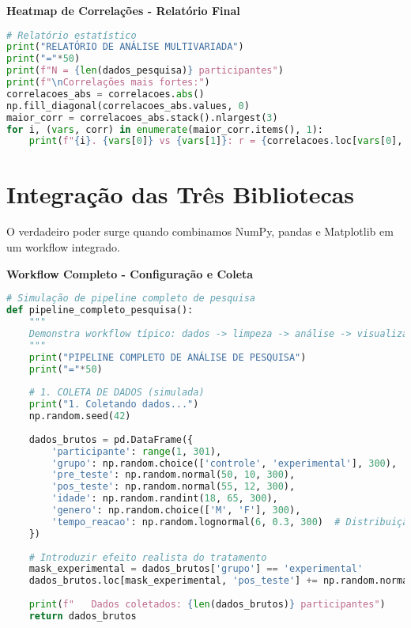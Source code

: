 \begin{researchbox}
\textbf{Heatmap de Correlações - Relatório Final}

\begin{lstlisting}[language=Python]
# Relatório estatístico
print("RELATÓRIO DE ANÁLISE MULTIVARIADA")
print("="*50)
print(f"N = {len(dados_pesquisa)} participantes")
print(f"\nCorrelações mais fortes:")
correlacoes_abs = correlacoes.abs()
np.fill_diagonal(correlacoes_abs.values, 0)
maior_corr = correlacoes_abs.stack().nlargest(3)
for i, (vars, corr) in enumerate(maior_corr.items(), 1):
    print(f"{i}. {vars[0]} vs {vars[1]}: r = {correlacoes.loc[vars[0], vars[1]]:.3f}")
\end{lstlisting}
\end{researchbox}

\section{Integração das Três Bibliotecas}

O verdadeiro poder surge quando combinamos NumPy, pandas e Matplotlib em um workflow integrado.

\begin{examplebox}
\textbf{Workflow Completo - Configuração e Coleta}

\begin{lstlisting}[language=Python]
# Simulação de pipeline completo de pesquisa
def pipeline_completo_pesquisa():
    """
    Demonstra workflow típico: dados -> limpeza -> análise -> visualização
    """
    print("PIPELINE COMPLETO DE ANÁLISE DE PESQUISA")
    print("="*50)
    
    # 1. COLETA DE DADOS (simulada)
    print("1. Coletando dados...")
    np.random.seed(42)
    
    dados_brutos = pd.DataFrame({
        'participante': range(1, 301),
        'grupo': np.random.choice(['controle', 'experimental'], 300),
        'pre_teste': np.random.normal(50, 10, 300),
        'pos_teste': np.random.normal(55, 12, 300),
        'idade': np.random.randint(18, 65, 300),
        'genero': np.random.choice(['M', 'F'], 300),
        'tempo_reacao': np.random.lognormal(6, 0.3, 300)  # Distribuição realista
    })
    
    # Introduzir efeito realista do tratamento
    mask_experimental = dados_brutos['grupo'] == 'experimental'
    dados_brutos.loc[mask_experimental, 'pos_teste'] += np.random.normal(8, 3, mask_experimental.sum())
    
    print(f"   Dados coletados: {len(dados_brutos)} participantes")
    return dados_brutos
\end{lstlisting}
\end{examplebox}

